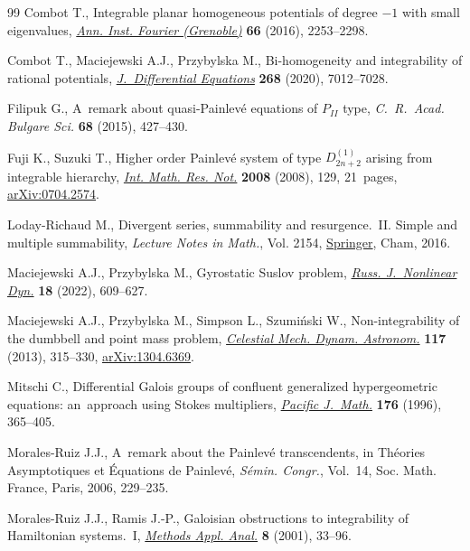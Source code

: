 \documentclass[pdftex]{sigma}
\numberwithin{equation}{section}
\begin{document}
\begin{thebibliography}{99}
Combot T., Integrable planar homogeneous potentials of degree {$-1$} with small
 eigenvalues, \href{https://doi.org/10.5802/aif.3063}{\textit{Ann. Inst. Fourier (Grenoble)}} \textbf{66} (2016),
 2253--2298.

Combot T., Maciejewski A.J., Przybylska M., Bi-homogeneity and integrability of
 rational potentials, \href{https://doi.org/10.1016/j.jde.2019.11.074}{\textit{J.~Differential Equations}} \textbf{268} (2020),
 7012--7028.

Filipuk G., A~remark about quasi-{P}ainlev\'e equations of {$P_{II}$} type,
 \textit{C.~R.~Acad. Bulgare Sci.} \textbf{68} (2015), 427--430.

Fuji K., Suzuki T., Higher order {P}ainlev\'e system of type {$D^{(1)}_{2n+2}$}
 arising from integrable hierarchy, \href{https://doi.org/10.1093/imrn/rnm129}{\textit{Int. Math. Res. Not.}}
 \textbf{2008} (2008), 129, 21~pages, \href{https://arxiv.org/abs/0704.2574}{arXiv:0704.2574}.

Loday-Richaud M., Divergent series, summability and resurgence.~{II}. {S}imple
 and multiple summability, \textit{Lecture Notes in Math.}, Vol. 2154,
 \href{https://doi.org/10.1007/978-3-319-29075-1}{Springer}, Cham, 2016.

Maciejewski A.J., Przybylska M., Gyrostatic {S}uslov problem, \href{https://doi.org/10.20537/nd221210}{\textit{Russ.
 J.~Nonlinear Dyn.}} \textbf{18} (2022), 609--627.

Maciejewski A.J., Przybylska M., Simpson L., Szumi\'nski W., Non-integrability
 of the dumbbell and point mass problem, \href{https://doi.org/10.1007/s10569-013-9514-7}{\textit{Celestial Mech. Dynam.
 Astronom.}} \textbf{117} (2013), 315--330, \href{https://arxiv.org/abs/1304.6369}{arXiv:1304.6369}.

Mitschi C., Differential {G}alois groups of confluent generalized
 hypergeometric equations: an~approach using {S}tokes multipliers,
 \href{https://doi.org/10.2140/pjm.1996.176.365}{\textit{Pacific J.~Math.}} \textbf{176} (1996), 365--405.

Morales-Ruiz J.J., A~remark about the {P}ainlev\'e transcendents, in Th\'eories
 Asymptotiques et \'Equations de {P}ainlev\'e, \textit{S\'emin. Congr.},
 Vol.~14, Soc. Math. France, Paris, 2006, 229--235.

Morales-Ruiz J.J., Ramis J.-P., Galoisian obstructions to integrability of
 {H}amiltonian systems.~{I}, \href{https://doi.org/10.4310/MAA.2001.v8.n1.a3}{\textit{Methods Appl. Anal.}} \textbf{8} (2001),
 33--96.


\end{thebibliography}
\end{document}
